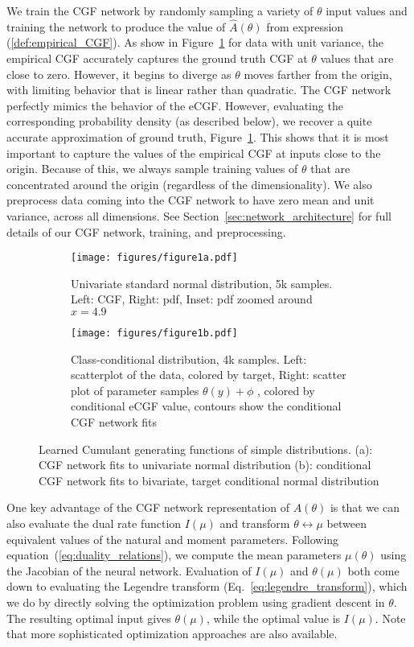 \documentclass{article}      %
\begin{document}
We train the CGF network by randomly sampling a variety of $\theta$ input values and training the network to produce the value of $\hat A(\theta)$ from expression (\ref{def:empirical_CGF}).
As show in Figure~\ref{fig:1a_CGF_Normal} for data with unit variance, the empirical CGF accurately captures the ground truth CGF at $\theta$ values that are close to zero.
However, it begins to diverge as $\theta$ moves farther from the origin, with limiting behavior that is linear rather than quadratic. 
The CGF network perfectly mimics the behavior of the eCGF.
However, evaluating the corresponding probability density (as described below), we recover a quite accurate approximation of ground truth, Figure~\ref{fig:1a_CGF_Normal}.
This shows that it is most important to capture the values of the empirical CGF at inputs close to the origin.
Because of this, we always sample training values of $\theta$ that are concentrated around the origin (regardless of the dimensionality).
We also preprocess data coming into the CGF network to have zero mean and unit variance, across all dimensions. 
See Section~\ref{sec:network_architecture} for full details of our CGF network, training, and preprocessing.

\begin{figure}[tb]
  \centering
  \begin{subfigure}[t]{0.5\textwidth}
    \centering
    \texttt{[image: figures/figure1a.pdf]}
    \caption{Univariate standard normal distribution, 5k samples. Left: CGF, Right: pdf, Inset: pdf zoomed around $x=4.9$}
    \label{fig:1a_CGF_Normal}
  \end{subfigure}
  \begin{subfigure}[t]{0.5\textwidth}
    \centering
    \texttt{[image: figures/figure1b.pdf]}
    \caption{Class-conditional distribution, 4k samples. Left: scatterplot of the data, colored by target, Right: scatter plot of parameter samples $\theta(y) + \phi$ , colored by conditional eCGF value, contours show the conditional CGF network fits}
    \label{fig:1b_conditional_CGF}
  \end{subfigure}

  \caption{Learned Cumulant generating functions of simple distributions. (a): CGF network fits to univariate normal distribution (b): conditional CGF network fits to bivariate, target conditional normal distribution}
  \label{fig:1_CGF}
\end{figure}


One key advantage of the CGF network representation of $A(\theta)$ is that we can also evaluate the dual rate function $I(\mu)$ and transform $\theta \leftrightarrow \mu$ between equivalent values of the natural and moment parameters.
Following equation~(\ref{eq:duality_relations}), we compute the mean parameters $\mu(\theta)$ using the Jacobian of the neural network. 
Evaluation of $I(\mu)$ and $\theta(\mu)$ both come down to evaluating the Legendre transform (Eq.~\ref{eq:legendre_transform}), which we do by directly solving the optimization problem using gradient descent in $\theta$.
The resulting optimal input gives $\theta(\mu)$, while the optimal value is $I(\mu)$.
Note that more sophisticated optimization approaches are also available.
\end{document}
